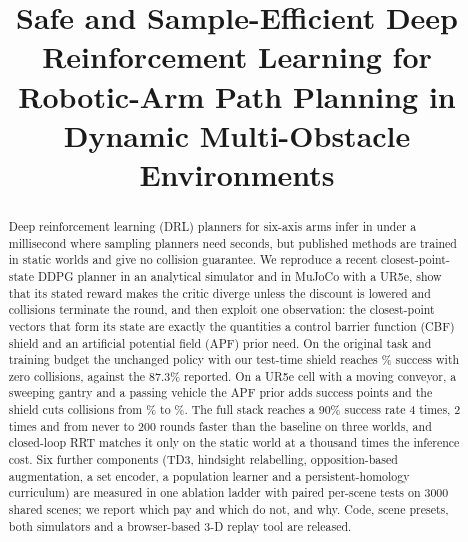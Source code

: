\documentclass[conference]{IEEEtran}
\begin{document}
\title{Safe and Sample-Efficient Deep Reinforcement Learning for Robotic-Arm Path Planning in Dynamic Multi-Obstacle Environments
}

\author{



}

\maketitle

\begin{abstract}
Deep reinforcement learning (DRL) planners for six-axis arms infer in under a millisecond where sampling planners need seconds, but published methods are trained in static worlds and give no collision guarantee. We reproduce a recent closest-point-state DDPG planner in an analytical simulator and in MuJoCo with a UR5e, show that its stated reward makes the critic diverge unless the discount is lowered and collisions terminate the round, and then exploit one observation: the closest-point vectors that form its state are exactly the quantities a control barrier function (CBF) shield and an artificial potential field (APF) prior need. On the original task and training budget the unchanged policy with our test-time shield reaches \Sstaticshieldevalcmk\% success with zero collisions, against the 87.3\% reported. On a UR5e cell with a moving conveyor, a sweeping gantry and a passing vehicle the APF prior adds \gSuretdherapf{} success points and the shield cuts collisions from \Curebase\% to \Cureshieldevalcm\%. The full stack reaches a 90\% success rate 4 times, 2 times and from never to 200 rounds faster than the baseline on three worlds, and closed-loop RRT matches it only on the static world at a thousand times the inference cost. Six further components (TD3, hindsight relabelling, opposition-based augmentation, a set encoder, a population learner and a persistent-homology curriculum) are measured in one ablation ladder with paired per-scene tests on 3000 shared scenes; we report which pay and which do not, and why. Code, scene presets, both simulators and a browser-based 3-D replay tool are released.
\end{abstract}
\end{document}
